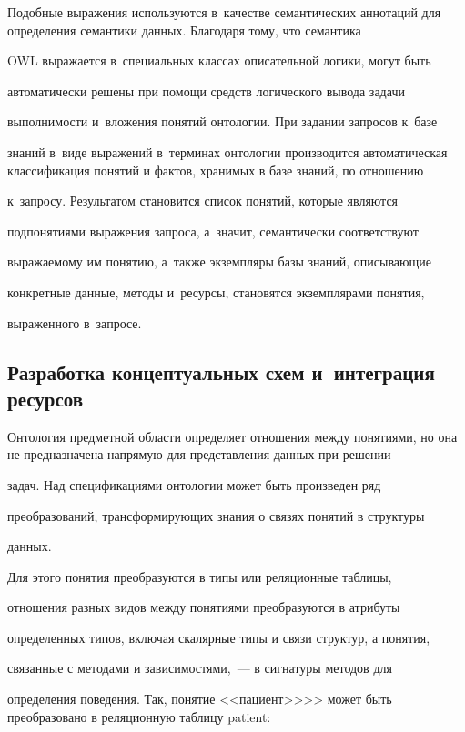       

      Подобные выражения используются в~качестве семантических аннотаций для определения семантики данных. Благодаря тому, что семантика 

      OWL выражается в~специальных классах описательной логики, могут быть 

автоматически решены при помощи средств логического вывода задачи 

выполнимости и~вложения понятий онтологии. При задании запросов к~базе 

знаний в~виде выражений в~терминах онтологии производится автоматическая классификация понятий и фактов, хранимых в базе знаний, по отношению 

к~запросу. Результатом становится список понятий, которые являются 

подпонятиями выражения запроса, а~значит, семантически соответствуют 

выражаемому им понятию, а~также экземпляры базы знаний, описывающие 

конкретные данные, методы и~ресурсы, становятся экземплярами понятия, 

выраженного в~запросе.

      

\subsection{Разработка концептуальных схем и~интеграция ресурсов}

      

      Онтология предметной области определяет отношения между понятиями, но она не предназначена напрямую для представления данных при решении 

задач. Над спецификациями онтологии может быть произведен ряд

 преобразований, трансформирующих знания о связях понятий в структуры

 данных.

      

      Для этого понятия преобразуются в типы или реляционные таблицы, 

отношения разных видов между понятиями преобразуются в атрибуты 

определенных типов, включая скалярные типы и связи структур, а понятия, 

связанные с методами и зависимостями,~--- в сигнатуры методов для 

определения поведения. Так, понятие <<пациент>>>> может быть преобразовано в реляционную таблицу patient:

